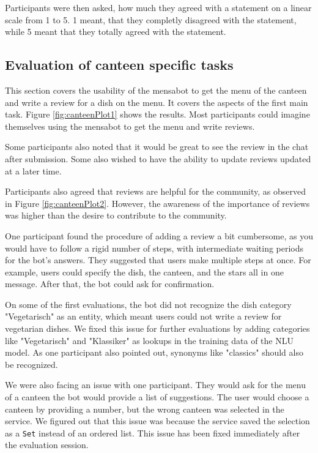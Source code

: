Participants were then asked, how much they agreed with a statement on a linear scale from 1 to 5. 1 meant, that they completly disagreed with the statement, while 5 meant that they totally agreed with the statement. 
\subsection{Evaluation of canteen specific tasks}  
This section covers the usability of the mensabot to get the menu of the canteen and write a review for a dish on the menu. It covers the aspects of the first main task. Figure \ref{fig:canteenPlot1} shows the results. Most participants could imagine themselves using the mensabot to get the menu and write reviews.
 
Some participants also noted that it would be great to see the review in the chat after submission. Some also wished to have the ability to update reviews updated at a later time.

Participants also agreed that reviews are helpful for the community, as observed in Figure \ref{fig:canteenPlot2}. 
However, the awareness of the importance of reviews was higher than the desire to contribute to the community. 

One participant found the procedure of adding a review a bit cumbersome, as you would have to follow a rigid number of steps, with intermediate waiting periods for the bot's answers. They suggested that users make multiple steps at once. For example, users could specify the dish, the canteen, and the stars all in one message. After that, the bot could ask for confirmation.

On some of the first evaluations, the bot did not recognize the dish category "Vegetarisch" as an entity, which meant users could not write a review for vegetarian dishes. We fixed this issue for further evaluations by adding categories like "Vegetarisch" and "Klassiker" as lookups in the training data of the NLU model. 
As one participant also pointed out, synonyms like "classics" should also be recognized.

We were also facing an issue with one participant. They would ask for the menu of a canteen the bot would provide a list of suggestions. The user would choose a  canteen by providing a number, but the wrong canteen was selected in the service. We figured out that this issue was because the service saved the selection as a \texttt{Set} instead of an ordered list.
This issue has been fixed immediately after the evaluation session.

